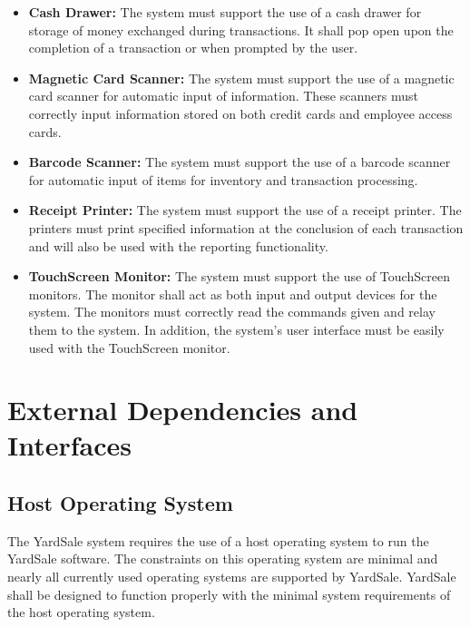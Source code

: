 \documentclass{report}
\begin{document}
            \begin{itemize}
                \item {\bf Cash Drawer:} The system must support the use of a
                cash drawer for storage of money exchanged during transactions.
                It shall pop open upon the completion of a transaction or when
                prompted by the user.

                \item {\bf Magnetic Card Scanner:} The system must support the use
                of a magnetic card scanner for automatic input of information.  These
                scanners must correctly input information stored on both credit cards
                and employee access cards.

                \item {\bf Barcode Scanner:} The system must support the use of
                a barcode scanner for automatic input of items for inventory
                and transaction processing.

                \item {\bf Receipt Printer:} The system must support the use of
                a receipt printer.  The printers must print specified information
                at the conclusion of each transaction and will also be used with
                the reporting functionality.

                \item {\bf TouchScreen Monitor:} The system must support the use
                of TouchScreen monitors.  The monitor shall act as both input and
                output devices for the system.  The monitors must correctly read
                the commands given and relay them to the system.
                In addition, the system's user interface must be
                easily used with the TouchScreen monitor.
            \end{itemize}

    \section{External Dependencies and Interfaces}
	    \subsection{Host Operating System}
	        The YardSale system requires the use of a host operating system
		to run the YardSale software.  The constraints on this operating
		system are minimal and nearly all currently used operating systems
		are supported by YardSale.  YardSale shall be designed to function
		properly with the minimal system requirements of the host
		operating system.
\end{document}
